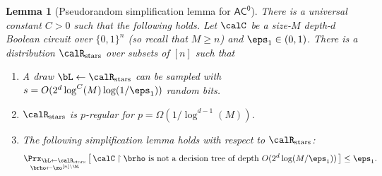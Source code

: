 \documentclass[11pt]{article}
\numberwithin{equation}{section}
\newtheorem{lemma}[theorem]{Lemma}
\theoremstyle{definition}
\theoremstyle{plain}
\theoremstyle{plain}
\newcommand{\acz}{\mathsf{AC^0}}
\newcommand{\uhr}{\upharpoonright}
\newcommand{\stars}{\mathrm{stars}}
\begin{document}
\begin{lemma}[Pseudorandom simplification lemma for $\acz$]
\label{lem:PSL-AC0} 
There is a universal constant $C > 0$ such that the following holds. Let $\calC$ be a size-$M$ depth-$d$ Boolean circuit over $\{0,1\}^n$ (so recall that $M \geq n$) and $\eps_1 \in (0,1)$. There is a distribution $\calR_\stars$ over subsets of $[n]$ such that 
\begin{enumerate} 
\item A draw $\bL\leftarrow\calR_\stars$ can be sampled with $s = O(2^{d} \log^{C}(M) \log(1/\eps_1))$ random bits.
\item $\calR_\stars$ is $p$-regular for $p = \Omega(1/\log^{d-1}(M))$. 
\item The following simplification lemma holds with respect to $\calR_\stars$:\[ \mathop{\Prx_{\bL\leftarrow\calR_\stars}}_{\brho\leftarrow\zo^{[n]\setminus \bL}}\big[\,\text{$\calC \uhr \brho$ is not a decision tree of depth $O(2^d\log(M/\eps_1))$}\,\big] \le \eps_1. \]
\end{enumerate} 
\end{lemma}
\end{document}
